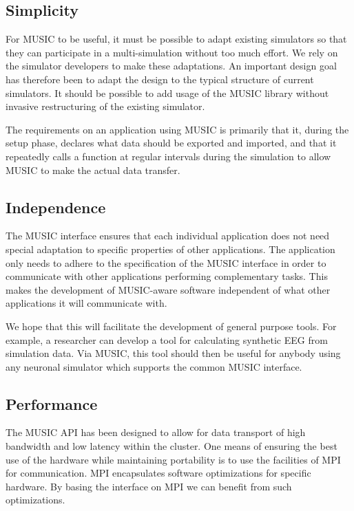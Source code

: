 \documentclass[a4paper]{report}
\begin{document}
\subsection{Simplicity}
\label{sec:simplicity}

For MUSIC to be useful, it must be possible to adapt existing
simulators so that they can participate in a multi-simulation without
too much effort.  We rely on the simulator developers to make these
adaptations.  An important design goal has therefore been to adapt the
design to the typical structure of current simulators.  It should be
possible to add usage of the MUSIC library without invasive
restructuring of the existing simulator.

The requirements on an application using MUSIC is primarily that it,
during the setup phase, declares what data should be exported and
imported, and that it repeatedly calls a function at regular intervals
during the simulation to allow MUSIC to make the actual data transfer.


\subsection{Independence}

The MUSIC interface ensures that each individual application does not
need special adaptation to specific properties of other applications.
The application only needs to adhere to the specification of the MUSIC
interface in order to communicate with other applications performing
complementary tasks.  This makes the development of MUSIC-aware
software independent of what other applications it will communicate
with.

We hope that this will facilitate the development of general purpose
tools.  For example, a researcher can develop a tool for calculating
synthetic EEG from simulation data.  Via MUSIC, this tool should then
be useful for anybody using any neuronal simulator which supports the
common MUSIC interface.


\subsection{Performance}

The MUSIC API has been designed to allow for data transport of high
bandwidth and low latency within the cluster.  One means of ensuring
the best use of the hardware while maintaining portability is to use
the facilities of MPI for communication.  MPI encapsulates software
optimizations for specific hardware. By basing the interface on MPI we
can benefit from such optimizations.
\end{document}

